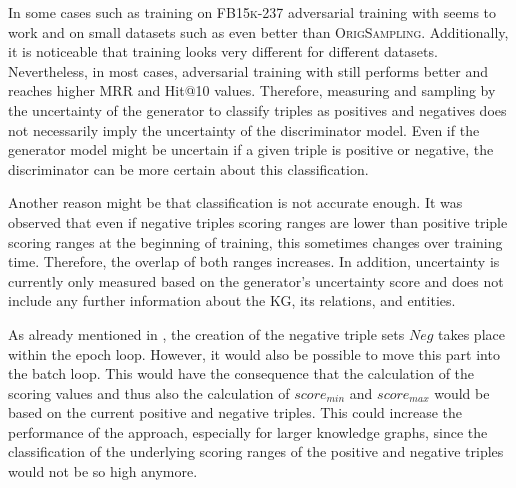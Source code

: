 

In some cases such as training on \textsc{FB15k-237} adversarial training with \ussoftmax seems to work and on small datasets such as \umls even better than \textsc{OrigSampling}.
Additionally, it is noticeable that training looks very different for different datasets.
Nevertheless, in most cases, adversarial training with \origsampling still performs better and reaches higher MRR and Hit@10 values.
Therefore, measuring and sampling by the uncertainty of the generator to classify triples as positives and negatives does not necessarily imply the uncertainty of the discriminator model.
Even if the generator model might be uncertain if a given triple is positive or negative, the discriminator can be more certain about this classification.
\clearpage



Another reason might be that classification is not accurate enough.
It was observed that even if negative triples scoring ranges are lower than positive triple scoring ranges at the beginning of training, this sometimes changes over training time.
Therefore, the overlap of both ranges increases.
In addition, uncertainty is currently only measured based on the generator's uncertainty score and does not include any further information about the \ac{KG}, its relations, and entities.

As already mentioned in , the creation of the negative triple sets $Neg$ takes place within the epoch loop.
However, it would also be possible to move this part into the batch loop.
This would have the consequence that the calculation of the scoring values and thus also the calculation of $score_{min}$ and $score_{max}$ would be based on the current positive and negative triples.
This could increase the performance of the approach, especially for larger knowledge graphs, since the classification of the underlying scoring ranges of the positive and negative triples would not be so high anymore.
\clearpage


